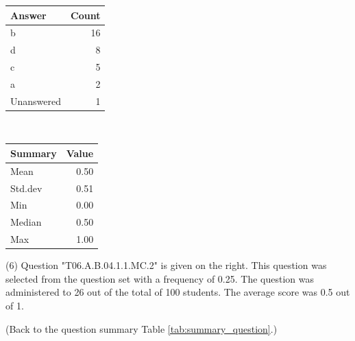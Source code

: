 \documentclass[12pt,nohyper]{tufte-handout}\usepackage[]{graphicx}\usepackage[]{color}
\begin{document}
\begin{center}%
\begin{tabular}{lr}
  \hline
Answer & Count \\ 
  \hline
b &  16 \\ 
  d &   8 \\ 
  c &   5 \\ 
  a &   2 \\ 
  Unanswered &   1 \\ 
   \hline
\end{tabular}
~~~~~~~~%
\begin{tabular}{lr}
  \hline
Summary & Value \\ 
  \hline
Mean & 0.50 \\ 
  Std.dev & 0.51 \\ 
  Min & 0.00 \\ 
  Median & 0.50 \\ 
  Max & 1.00 \\ 
   \hline
\end{tabular}
\end{center}\newpage{} (6) Question "T06.A.B.04.1.1.MC.2" is given on the right. This question was selected from the question set with a frequency of 0.25. The question was administered to 26 out of the total of 100 students. The average score was 0.5 out of 1.

 (Back to the question summary Table \ref{tab:summary_question}.)
\end{document}
